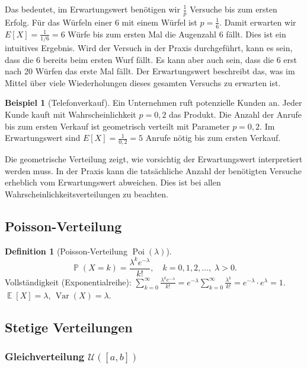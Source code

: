 ﻿\documentclass[12pt,a4paper]{article}
\theoremstyle{definition}
\newtheorem{definition}{Definition}[section]
\newtheorem{beispiel}{Beispiel}[section]
\theoremstyle{plain}
\theoremstyle{remark}
\DeclareMathOperator{\E}{\mathbb{E}}
\DeclareMathOperator{\Var}{Var}
\DeclareMathOperator{\Prob}{\mathbb{P}}
\begin{document}
Das bedeutet, im Erwartungswert benötigen wir $\frac{1}{p}$ Versuche bis zum
ersten Erfolg. Für das Würfeln einer $6$ mit einem Würfel ist
$p = \frac{1}{6}$. Damit erwarten wir $E[X] = \frac{1}{1/6} = 6$ Würfe bis
zum ersten Mal die Augenzahl $6$ fällt. Dies ist ein intuitives Ergebnis.
Wird der Versuch in der Praxis durchgeführt, kann es sein, dass die $6$
bereits beim ersten Wurf fällt. Es kann aber auch sein, dass die $6$ erst
nach 20 Würfen das erste Mal fällt. Der Erwartungswert beschreibt das, was
im Mittel über viele Wiederholungen dieses gesamten Versuchs zu erwarten ist.

\begin{beispiel}[Telefonverkauf]\label{bsp:telefonverkauf}
  Ein Unternehmen ruft potenzielle Kunden an. Jeder Kunde kauft mit
  Wahrscheinlichkeit $p = 0{,}2$ das Produkt. Die Anzahl der Anrufe bis zum
  ersten Verkauf ist geometrisch verteilt mit Parameter $p = 0{,}2$. Im
  Erwartungswert sind $E[X] = \frac{1}{0{,}2} = 5$ Anrufe nötig bis zum
  ersten Verkauf.
\end{beispiel}

Die geometrische Verteilung zeigt, wie vorsichtig der Erwartungswert
interpretiert werden muss. In der Praxis kann die tatsächliche Anzahl der
benötigten Versuche erheblich vom Erwartungswert abweichen. Dies ist bei allen
Wahrscheinlichkeitsverteilungen zu beachten.

\subsection{Poisson-Verteilung}

\begin{definition}[Poisson-Verteilung $\operatorname{Poi}(\lambda)$]\label{def:poisson}
  \[
    \Prob(X=k) = \frac{\lambda^k e^{-\lambda}}{k!}, \quad k=0,1,2,\ldots,\;
    \lambda > 0.
  \]
  Vollständigkeit (Exponentialreihe):
  $\sum_{k=0}^{\infty}\frac{\lambda^k e^{-\lambda}}{k!}
   = e^{-\lambda} \sum_{k=0}^{\infty}\frac{\lambda^k}{k!}
   = e^{-\lambda} \cdot e^{\lambda} = 1$. \\
  $\E[X] = \lambda$, $\Var(X) = \lambda$.
\end{definition}

\subsection{Stetige Verteilungen}

\subsubsection{Gleichverteilung $\mathcal{U}([a,b])$}
\end{document}
